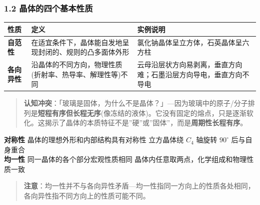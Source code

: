 \subsubsection{1.2 晶体的四个基本性质}\label{ux6676ux4f53ux7684ux56dbux4e2aux57faux672cux6027ux8d28}

{\def\LTcaptype{none} %
\begin{longtable}[]{@{}
  >{\raggedright\arraybackslash}p{}
  >{\raggedright\arraybackslash}p{}
  >{\raggedright\arraybackslash}p{}@{}}
\toprule\noalign{}
\begin{minipage}[b]{\linewidth}\raggedright
性质
\end{minipage} & \begin{minipage}[b]{\linewidth}\raggedright
定义
\end{minipage} & \begin{minipage}[b]{\linewidth}\raggedright
实例说明
\end{minipage} \\
\midrule\noalign{}
\endhead
\bottomrule\noalign{}
\endlastfoot
\textbf{自范性} & 在适宜条件下，晶体能自发地呈现封闭的、规则的凸多面体外形 & 氯化钠晶体呈立方体，石英晶体呈六方柱 \\
\textbf{各向异性} & 沿晶体的不同方向，物理性质(折射率、热导率、解理性等)不同 & 云母沿层状方向易剥离，垂直方向难；石墨沿层方向导电，垂直方向不导电 \\
\end{longtable}
}

\begin{quote}
\textbf{认知冲突}：「玻璃是固体，为什么不是晶体？」---因为玻璃中的原子/分子排列是\textbf{短程有序但长程无序}(像冻结的液体)。它没有固定的熔点，只是逐渐软化。这揭示了晶体的本质特征不是''硬''或''固体''，而是\textbf{周期性长程有序}。
\end{quote}

\textbf{对称性} \textbar{} 晶体的理想外形和内部结构具有对称性 \textbar{} 立方晶体绕 \(C_4\) 轴旋转 \(90^\circ\) 后与自身重合 \textbar{}\\
\textbf{均一性} \textbar{} 同一晶体的各个部分宏观性质相同 \textbar{} 晶体内任意取两点，化学组成和物理性质一致 \textbar{}

\begin{quote}
\textbf{注意}：均一性并不与各向异性矛盾---均一性指同一方向上的性质各处相同，各向异性指不同方向上的性质可能不同。
\end{quote}

